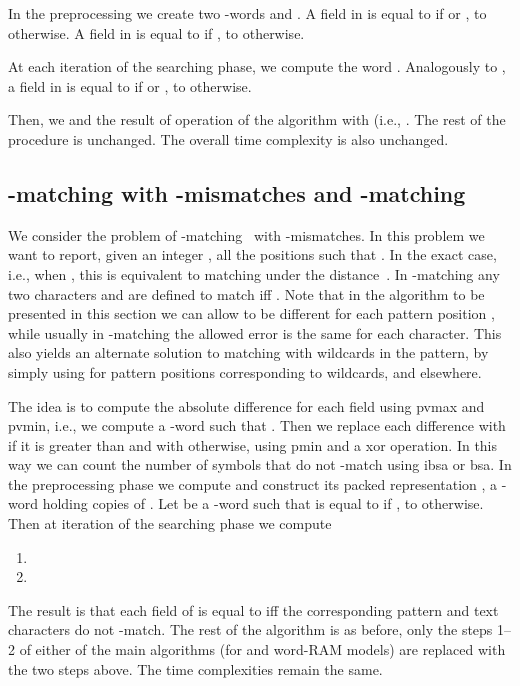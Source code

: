 \documentclass{llncs}
\def \bxor{\textsf{xor}\xspace}
\def \band{\textsf{and}\xspace}
\newcommand{\fword}[1]{-word}
\begin{document}
In the preprocessing we create two \fword{\log\sigma}s  and .
A field  in  is equal to  if  or
, to  otherwise. A field
 in  is equal to  if ,
to  otherwise.

At each iteration  of the searching phase, we compute the word .
Analogously to , a field  in  is equal to  if
 or , to  otherwise.

Then, we \band the result of operation  of the algorithm with
 (i.e., . The rest of
the procedure is unchanged. The overall time complexity is also
unchanged.

\subsection{-matching with -mismatches and -matching}

We consider the problem of -matching~\cite{CCIMPijcm02,DBLP:conf/cpm/CliffordCI05} with -mismatches.
In this problem we want to report, given an integer , all the positions  such
that .
In the exact case, i.e., when , this is equivalent to matching under the  distance~\cite{DBLP:conf/cpm/CliffordCI05}.
In -matching any two characters  and  are defined to match iff .
Note that in the algorithm to be presented in this section we can allow  to be different for each pattern position ,
while usually in -matching the allowed error  is the same for each character.
This also yields an alternate solution to matching with wildcards in the pattern, by simply
using  for pattern positions  corresponding to wildcards, and  elsewhere.

The idea is to compute the absolute difference  for
each field  using \textsf{pvmax} and \textsf{pvmin},
i.e., we compute a \fword{\log\sigma}  such that . Then we
replace each difference with  if it is greater than
 and with  otherwise, using \textsf{pmin} and a
\bxor operation. In this way we can count the number of symbols that do not -match using \textsf{ibsa} or \textsf{bsa}.
In the preprocessing phase we compute  and construct
its packed representation , a \fword{\log\sigma} holding  copies of .
Let  be a \fword{\log\sigma} such that  is equal to
 if , to  otherwise.
Then at iteration  of the searching phase we compute
\begin{enumerate}
\item 
\item 
\end{enumerate}
The result is that each field of  is equal to  iff the corresponding
pattern and text characters do not -match.
The rest of the algorithm is as before, only the steps 1--2 of either
of the main algorithms (for  and word-RAM models) are replaced
with the two steps above. The time complexities remain the same.
\end{document}
